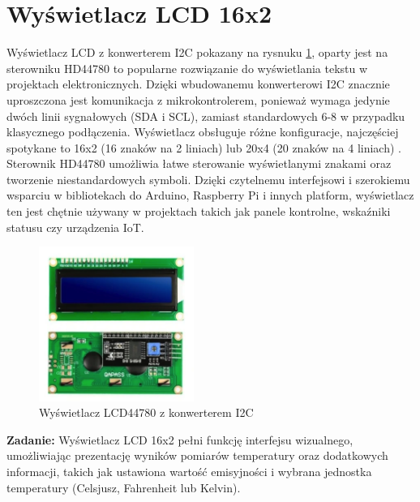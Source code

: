 \section{Wyświetlacz LCD 16x2}

Wyświetlacz LCD z konwerterem I2C pokazany na rysnuku \ref{fig:lcd}, oparty jest na sterowniku HD44780 to popularne rozwiązanie do wyświetlania tekstu w projektach elektronicznych. Dzięki wbudowanemu konwerterowi I2C znacznie uproszczona jest komunikacja z mikrokontrolerem, ponieważ wymaga jedynie dwóch linii sygnałowych (SDA i SCL), zamiast standardowych 6-8 w przypadku klasycznego podłączenia. Wyświetlacz obsługuje różne konfiguracje, najczęściej spotykane to 16x2 (16 znaków na 2 liniach) lub 20x4 (20 znaków na 4 liniach) \cite{7}. Sterownik HD44780 umożliwia łatwe sterowanie wyświetlanymi znakami oraz tworzenie niestandardowych symboli. Dzięki czytelnemu interfejsowi i szerokiemu wsparciu w bibliotekach do Arduino, Raspberry Pi i innych platform, wyświetlacz ten jest chętnie używany w projektach takich jak panele kontrolne, wskaźniki statusu czy urządzenia IoT.

\begin{figure}[h!]
        \centering
        \includegraphics[width=0.45\textwidth]{images/lcd.png}
        \caption{Wyświetlacz LCD44780 z konwerterem I2C \cite{7}}
        \label{fig:lcd}
    \end{figure}

\textbf{Zadanie:} Wyświetlacz LCD 16x2 pełni funkcję interfejsu wizualnego, umożliwiając prezentację wyników pomiarów temperatury oraz dodatkowych informacji, takich jak ustawiona wartość emisyjności i wybrana jednostka temperatury (Celsjusz, Fahrenheit lub Kelvin).

\vspace{12pt}



